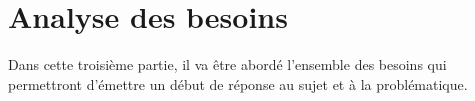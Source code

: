 \chapter{Analyse des besoins}

Dans cette troisième partie, il va être abordé l'ensemble des besoins qui permettront d'émettre un début de réponse au sujet et à la problématique.
 
